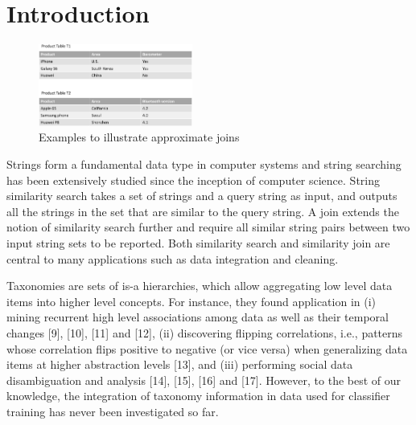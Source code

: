 \documentclass{sig-alternate}
\begin{document}




\section{Introduction}



\begin{figure}[t]
\centering
\includegraphics[width=0.45\textwidth]{figures/productexample}
 \caption{Examples to illustrate approximate joins}
\label{fig:autocompletion}
\end{figure}


Strings form a fundamental data type in computer systems and string searching has been extensively studied since the
inception of computer science. String similarity search takes a set of strings and a query string as input, and outputs all
the strings in the set that are similar to the query string. A join extends the notion of similarity search further and require
all similar string pairs between two input string sets to be reported. Both similarity search and similarity join are
central to many applications such as data integration and cleaning. 

 Taxonomies are sets of is-a hierarchies, which allow aggregating low level data items into higher level concepts. For instance, they found application in (i) mining recurrent high level associations among data as well as their temporal changes [9], [10], [11] and [12], (ii) discovering flipping correlations, i.e., patterns whose correlation flips positive to negative (or vice versa) when generalizing data items at higher abstraction levels [13], and (iii) performing social data disambiguation and analysis [14], [15], [16] and [17]. However, to the best of our knowledge, the integration of taxonomy information in data used for classifier training has never been investigated so far.
\end{document}
